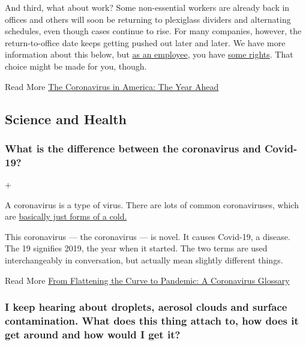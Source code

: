 And third, what about work? Some non-essential workers are already back
in offices and others will soon be returning to plexiglass dividers and
alternating schedules, even though cases continue to rise. For many
companies, however, the return-to-office date keeps getting pushed out
later and later. We have more information about this below, but
\href{https://www.cdc.gov/coronavirus/2019-ncov/community/guidance-business-response.html}{as
an employee}, you have
\href{https://www.osha.gov/SLTC/covid-19/standards.html}{some rights}.
That choice might be made for you, though.

 Read More
\href{https://www.nytimes3xbfgragh.onion/2020/04/18/health/coronavirus-america-future.html}{The
Coronavirus in America: The Year Ahead}

\hypertarget{science-and-health}{%
\subsection{Science and Health}\label{science-and-health}}

\hypertarget{what-is-the-difference-between-the-coronavirus-and-covid-19}{%
\subsubsection{What is the difference between the coronavirus and
Covid-19?}\label{what-is-the-difference-between-the-coronavirus-and-covid-19}}

+

A coronavirus is a type of virus. There are lots of common
coronaviruses, which are
\href{https://www.cdc.gov/coronavirus/general-information.html}{basically
just forms of a cold.}

This coronavirus --- the coronavirus --- is novel. It causes Covid-19, a
disease. The 19 signifies 2019, the year when it started. The two terms
are used interchangeably in conversation, but actually mean slightly
different things.

 Read More
\href{https://www.nytimes3xbfgragh.onion/2020/03/18/us/coronavirus-terms-glossary.html}{From
Flattening the Curve to Pandemic: A Coronavirus Glossary}

\hypertarget{i-keep-hearing-about-droplets-aerosol-clouds-and-surface-contamination-what-does-this-thing-attach-to-how-does-it-get-around-and-how-would-i-get-it}{%
\subsubsection{I keep hearing about droplets, aerosol clouds and surface
contamination. What does this thing attach to, how does it get around
and how would I get
it?}\label{i-keep-hearing-about-droplets-aerosol-clouds-and-surface-contamination-what-does-this-thing-attach-to-how-does-it-get-around-and-how-would-i-get-it}}

